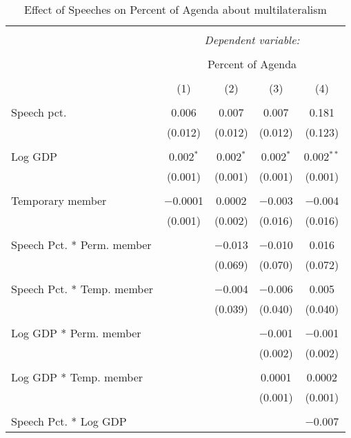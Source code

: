 
\begin{table}[!htbp] \centering 
  \caption{Effect of Speeches on Percent of Agenda about  multilateralism} 
  \label{} 
\begin{tabular}{@{\extracolsep{5pt}}lcccc} 
\\[-1.8ex]\hline 
\hline \\[-1.8ex] 
 & \multicolumn{4}{c}{\textit{Dependent variable:}} \\ 
\cline{2-5} 
\\[-1.8ex] & \multicolumn{4}{c}{Percent of Agenda} \\ 
\\[-1.8ex] & (1) & (2) & (3) & (4)\\ 
\hline \\[-1.8ex] 
 Speech pct. & 0.006 & 0.007 & 0.007 & 0.181 \\ 
  & (0.012) & (0.012) & (0.012) & (0.123) \\ 
  & & & & \\ 
 Log GDP & 0.002$^{*}$ & 0.002$^{*}$ & 0.002$^{*}$ & 0.002$^{**}$ \\ 
  & (0.001) & (0.001) & (0.001) & (0.001) \\ 
  & & & & \\ 
 Temporary member & $-$0.0001 & 0.0002 & $-$0.003 & $-$0.004 \\ 
  & (0.001) & (0.002) & (0.016) & (0.016) \\ 
  & & & & \\ 
 Speech Pct. * Perm. member &  & $-$0.013 & $-$0.010 & 0.016 \\ 
  &  & (0.069) & (0.070) & (0.072) \\ 
  & & & & \\ 
 Speech Pct. * Temp. member &  & $-$0.004 & $-$0.006 & 0.005 \\ 
  &  & (0.039) & (0.040) & (0.040) \\ 
  & & & & \\ 
 Log GDP * Perm. member &  &  & $-$0.001 & $-$0.001 \\ 
  &  &  & (0.002) & (0.002) \\ 
  & & & & \\ 
 Log GDP * Temp. member &  &  & 0.0001 & 0.0002 \\ 
  &  &  & (0.001) & (0.001) \\ 
  & & & & \\ 
 Speech Pct. * Log GDP &  &  &  & $-$0.007 \\ 

\end{tabular}
\end{table}
